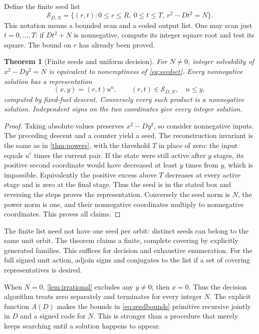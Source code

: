 \documentclass[11pt,letterpaper]{article}
\newtheorem{theorem}{Theorem}[section]
\theoremstyle{definition}
\begin{document}
Define the finite seed list
\begin{equation}\label{eq:seedset}
 \mathcal S_{D,N}=\{(r,t):0\le r\le R,\ 0\le t\le T,
                         \ r^2-Dt^2=N\}.
\end{equation}
This notation means a bounded scan and a coded output list. One may scan
just $t=0,\ldots,T$: if $Dt^2+N$ is nonnegative, compute its integer
square root and test its square. The bound on $r$ has already been proved.

\begin{theorem}[Finite seeds and uniform decision]\label{thm:general}
For $N\ne0$, integer solvability of $x^2-Dy^2=N$ is equivalent to
nonemptiness of \eqref{eq:seedset}. Every nonnegative solution has a
representation
\[
 (x,y)=(r,t)u^n,\qquad (r,t)\in\mathcal S_{D,N},\quad n\le y,
\]
computed by fixed-fuel descent. Conversely every such product is a
nonnegative solution. Independent signs on the two coordinates give every
integer solution.
\end{theorem}
\begin{proof}
Taking absolute values preserves $x^2-Dy^2$, so consider nonnegative inputs.
The preceding descent and a counter yield a seed. The reconstruction
invariant is the same as in \cref{thm:powers}, with the threshold $T$ in
place of zero: the input equals $u^c$ times the current pair.
If the state were still active after $y$ stages, its positive second
coordinate would have decreased at least $y$ times from $y$, which is
impossible. Equivalently the positive excess above $T$ decreases at every
active stage and is zero at the final stage. Thus the seed is in the stated
box and reversing the steps proves the representation.
Conversely the seed norm is $N$, the power norm is one, and their
nonnegative coordinates multiply to nonnegative coordinates. This proves
all claims.
\end{proof}

The finite list need not have one seed per orbit: distinct seeds can belong
to the same unit orbit. The theorem claims a finite, complete covering by
explicitly generated families. This suffices for decision and exhaustive
enumeration. For the full signed unit action, adjoin signs and conjugates
to the list if a set of covering representatives is desired.

When $N=0$, \cref{lem:irrational} excludes any $y\ne0$; then $x=0$.
Thus the decision algorithm treats zero separately and terminates for every
integer $N$. The explicit function $A(D)$ makes the bounds in
\eqref{eq:seedbounds} primitive recursive jointly in $D$ and a signed code
for $N$. This is stronger than a procedure that merely keeps searching until
a solution happens to appear.
\end{document}
